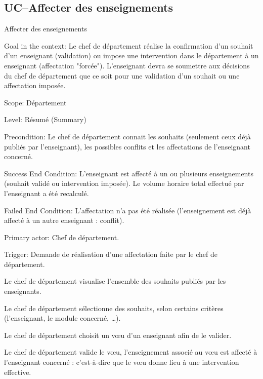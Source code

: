\subsection{UC\---Affecter des enseignements}

\begin{usecase}{Affecter des enseignements}
\begin{information}

 \item[Goal in the context:] Le chef de département réalise la confirmation d'un souhait d'un enseignant (validation) ou impose une intervention dans le département à un enseignant (affectation "forcée"). 
 L'enseignant devra se soumettre aux décisions du chef de département que ce soit pour une validation d'un souhait ou une affectation imposée.

\item[Scope:] Département

\item[{Level:}] Résumé (Summary)

 \item[{Precondition:}]
Le chef de département connait les souhaits (seulement ceux déjà publiés par l'enseignant), les possibles conflits et les affectations de l'enseignant concerné.

 \item[{Success End Condition:}]
L'enseignant est affecté à un ou plusieurs enseignements (souhait validé ou intervention imposée). 
Le volume horaire total effectué par l'enseignant a été recalculé.

 \item[{Failed End Condition:}]
 L'affectation n'a pas été réalisée (l'enseignement est déjà affecté à un autre enseignant : conflit).

\item[Primary actor:]
Chef de département.

 \item[Trigger:] Demande de réalisation d'une affectation faite par le chef de département.
\end{information}

\begin{scenario}
 \item Le chef de département visualise l'ensemble des souhaits publiés par les enseignants.
 \item Le chef de département sélectionne des souhaits, selon certains critères (l'enseignant, le module concerné, \dots).
 \item Le chef de département choisit un v\oe u d'un enseignant afin de le valider.
 \item Le chef de département valide le v\oe u, l'enseignement associé au v\oe u est affecté à l'enseignant concerné : c'est-à-dire que le v\oe u donne lieu à une intervention effective.
 \end{scenario}


\end{usecase}
